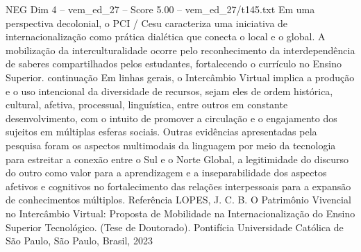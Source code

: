 \begin{textsample}{NEG Dim 4 – vem\_ed\_27 – Score 5.00 – vem\_ed\_27/t145.txt}
Em uma perspectiva decolonial, o PCI / Cesu caracteriza uma iniciativa de internacionalização como prática dialética que conecta o local e o global.
A mobilização da interculturalidade ocorre pelo reconhecimento da interdependência de saberes compartilhados pelos estudantes, fortalecendo o currículo no Ensino Superior. continuação Em linhas gerais, o Intercâmbio Virtual implica a produção e o uso intencional da diversidade de recursos, sejam eles de ordem histórica, cultural, afetiva, processual, linguística, entre outros em constante desenvolvimento, com o intuito de promover a circulação e o engajamento dos sujeitos em múltiplas esferas sociais.
Outras evidências apresentadas pela pesquisa foram os aspectos multimodais da linguagem por meio da tecnologia para estreitar a conexão entre o Sul e o Norte Global, a legitimidade do discurso do outro como valor para a aprendizagem e a inseparabilidade dos aspectos afetivos e cognitivos no fortalecimento das relações interpessoais para a expansão de conhecimentos múltiplos.
Referência LOPES, J.
C.
B.
O Patrimônio Vivencial no Intercâmbio Virtual: Proposta de Mobilidade na Internacionalização do Ensino Superior Tecnológico. (Tese de Doutorado).
Pontifícia Universidade Católica de São Paulo, São Paulo, Brasil, 2023

\end{textsample}
